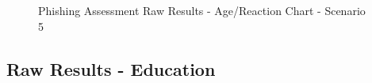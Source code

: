 \documentclass[a4paper]{article}
\begin{document}
\vspace{5mm}

\begin{figure}[H]
	\centering
	\caption{Phishing Assessment Raw Results - Age/Reaction Chart - Scenario 5}
	\label{chart-age-s5}
\end{figure}

\newpage

\subsection*{Raw Results - Education}
\end{document}

